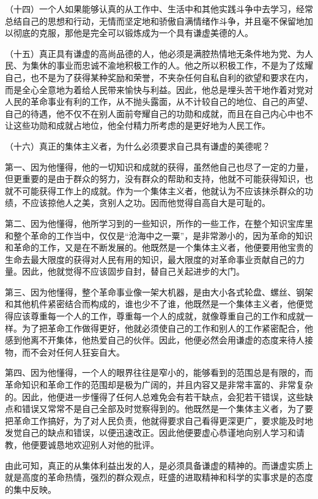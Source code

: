 （十四）一个人如果能够认真的从工作中、生活中和其他实践斗争中去学习，经常总结自己的思想和行动，无情而坚定地和骄傲自满情绪作斗争，并且毫不保留地加以彻底的克服，那他是完全可以锻炼成为一个具有谦虚美德的人。

（十五）真正具有谦虚的高尚品德的人，他必须是满腔热情地无条件地为党、为人民、为集休的事业而忠诚不渝地积极工作的人。他之所以积极工作，不是为了炫耀自己，也不是为了获得某种奖励和荣誉，不夹杂任何自私自利的欲望和要求在内，而是全心全意地为着给人民带来愉快与利益。因此，他总是埋头苦干地作着对党对人民的革命事业有利的工作，从不抛头露面，从不计较自己的地位、自己的声望、自己的待遇，他不仅不在别人面前夸耀自己的功勋和成就，而且在自己内心中也不让这些功勋和成就占地位，他全付精力所考虑的是更好地为人民工作。

（十六）真正的集体主义者，为什么必须要求自己具有谦虚的美德呢？

第一、因为他懂得，他的一切知识和成就的获得，虽然他自己也尽了一定的力量，但更重要的是由于群众的努力，没有群众的帮助和支持，他就不可能获得知识，也就不可能获得工作上的成就。作为一个集体主义者，他就认为不应该抹杀群众的功绩，不应该掠他人之美，贪别人之功。因而他觉得自高自大是可耻的。

第二、因为他懂得，他所学习到的一些知识，所作的一些工作，在整个知识宝库里和整个革命的工作当中，仅仅是“沧海中之一粟”，是非常渺小的，因为革命的知识和革命的工作，又是在不断发展的。他既然是一个集体主义者，他便要用他宝贵的生命去最大限度的获得对人民有用的知识，最大限度的对革命事业贡献自己的力量。因此，他就觉得不应该固步自封，替自己关起进步的大门。

第三、因为他懂得，整个革命事业像一架大机器，是由大小各式轮盘、螺丝、钢架和其他机件紧密结合而构成的，谁也少不了谁，他既然是一个集体主义者，他便觉得应该尊重每一个人的工作，尊重每一个人的成就，就像尊重自己的工作和成就一样。为了把革命工作做得更好，他就必须使自己的工作和别人的工作紧密配合，他感到他离不开集体，他热爱自己的伙伴。因此，他便必然会用谦虚的态度来待人接物，而不会对任何人狂妄自大。

第四、因为他懂得，一个人的眼界往往是窄小的，能够看到的范围总是有限的，而革命知识和革命工作的范围却是极为广阔的，并且内容又是非常丰富的、非常复杂的。因此，他便进一步懂得了任何人总难免会有若干缺点，会犯若干错误，这些缺点和错误又常常不是自己全部及时觉察得到的。他既然是一个集体主义者，为了要把革命工作搞好，为了对人民负责，他就得要求自己看得更深更广，要求能及时地发觉自己的缺点和错误，以便迅速改正。因此他便要虚心恭谨地向别人学习和请教，他便要诚恳地欢迎别人对他的批评。

由此可知，真正的从集体利益出发的人，是必须具备谦虚的精神的。而谦虚实质上就是高度的革命热情，强烈的群众观点，旺盛的进取精神和科学的实事求是的态度的集中反映。

